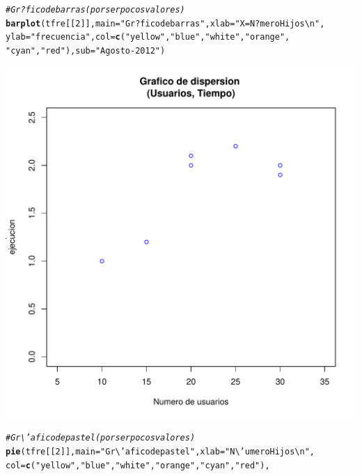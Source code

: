 \documentclass[12pt,letterpaper]{article}\usepackage[]{graphicx}\usepackage[]{color}
\makeatletter
\def\maxwidth{ %
  \ifdim\Gin@nat@width>\linewidth
    \linewidth
  \else
    \Gin@nat@width
  \fi
}
\newcommand{\hlnum}[1]{\textcolor[rgb]{0.686,0.059,0.569}{#1}}%
\newcommand{\hlstr}[1]{\textcolor[rgb]{0.192,0.494,0.8}{#1}}%
\newcommand{\hlcom}[1]{\textcolor[rgb]{0.678,0.584,0.686}{\textit{#1}}}%
\newcommand{\hlstd}[1]{\textcolor[rgb]{0.345,0.345,0.345}{#1}}%
\newcommand{\hlkwc}[1]{\textcolor[rgb]{0.333,0.667,0.333}{#1}}%
\newcommand{\hlkwd}[1]{\textcolor[rgb]{0.737,0.353,0.396}{\textbf{#1}}}%
\newenvironment{kframe}{%
 \def\at@end@of@kframe{}%
 \ifinner\ifhmode%
  \def\at@end@of@kframe{\end{minipage}}%
  \begin{minipage}{\columnwidth}%
 \fi\fi%
 \def\FrameCommand##1{\hskip\@totalleftmargin \hskip-\fboxsep
 \colorbox{shadecolor}{##1}\hskip-\fboxsep
     \hskip-\linewidth \hskip-\@totalleftmargin \hskip\columnwidth}%
 \MakeFramed {\advance\hsize-\width
   \@totalleftmargin\z@ \linewidth\hsize
   \@setminipage}}%
 {\par\unskip\endMakeFramed%
 \at@end@of@kframe}
\newenvironment{knitrout}{}{} %
\makeatother
\begin{document}
\begin {itemize}
\begin{knitrout}
\color{fgcolor}\begin{kframe}
\begin{alltt}
\hlcom{# Gr?fico de barras (por ser pocos valores)}
\hlkwd{barplot}\hlstd{(tfre[[}\hlnum{2}\hlstd{]],} \hlkwc{main}\hlstd{=}\hlstr{"Gr?fico de barras"}\hlstd{,} \hlkwc{xlab}\hlstd{=}\hlstr{"X = N?mero Hijos\textbackslash{}n"}\hlstd{,}
        \hlkwc{ylab}\hlstd{=}\hlstr{"frecuencia"}\hlstd{,}\hlkwc{col}\hlstd{=}\hlkwd{c}\hlstd{(}\hlstr{"yellow"}\hlstd{,} \hlstr{"blue"}\hlstd{,} \hlstr{"white"}\hlstd{,} \hlstr{"orange"}\hlstd{,}
                                \hlstr{"cyan"}\hlstd{,} \hlstr{"red"}\hlstd{),} \hlkwc{sub}\hlstd{=}\hlstr{"Agosto-2012"}\hlstd{)}
\end{alltt}
\end{kframe}
\includegraphics[width=\maxwidth]{figure/unnamed-chunk-9-1} 
\begin{kframe}\begin{alltt}
\hlcom{# Gr\textbackslash{}'afico de pastel (por ser pocos valores)}
\hlkwd{pie}\hlstd{(tfre[[}\hlnum{2}\hlstd{]],} \hlkwc{main}\hlstd{=}\hlstr{"Gr\textbackslash{}'afico de pastel"}\hlstd{,} \hlkwc{xlab}\hlstd{=}\hlstr{"N\textbackslash{}'umero Hijos \textbackslash{}n"}\hlstd{,}
    \hlkwc{col}\hlstd{=}\hlkwd{c}\hlstd{(}\hlstr{"yellow"}\hlstd{,} \hlstr{"blue"}\hlstd{,}\hlstr{"white"}\hlstd{,} \hlstr{"orange"}\hlstd{,} \hlstr{"cyan"}\hlstd{,} \hlstr{"red"}\hlstd{),}

\end{alltt}
\end{kframe}
\end{knitrout}
\end{itemize}
\end{document}
